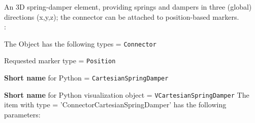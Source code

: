 \ei

%
\newpage


\label{sec:item:ObjectConnectorCartesianSpringDamper}
An 3D spring-damper element, providing springs and dampers in three (global) directions (x,y,z); the connector can be attached to position-based markers.
\vspace{12pt}\\

\noindent {}:
\bi
  \item The Object has the following types = \texttt{Connector}
  \item Requested marker type = \texttt{Position}
  \item {\bf Short name} for Python = \texttt{CartesianSpringDamper}
  \item {\bf Short name} for Python visualization object = \texttt{VCartesianSpringDamper}
\ei\vspace{12pt} \noindent 
The item  with type = 'ConnectorCartesianSpringDamper' has the following parameters:
\vspace{-0.5cm}\\
\vspace{-0.5cm}\\
